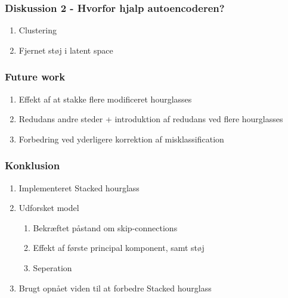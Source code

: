 \documentclass{beamer}
\begin{document}
\begin{frame}
    \frametitle{Diskussion 2 - Hvorfor hjalp autoencoderen?}
    \begin{enumerate}
        \item<1-> Clustering
        \item<2> Fjernet støj i latent space
    \end{enumerate}
\end{frame}

\begin{frame}
    \frametitle{Future work}
    \begin{enumerate}
        \item<1-> Effekt af at stakke flere modificeret hourglasses
        \item<2-> Redudans andre steder + introduktion af redudans ved flere hourglasses
        \item<3-> Forbedring ved yderligere korrektion af misklassification
    \end{enumerate}
\end{frame}

\begin{frame}
    \frametitle{Konklusion}
    \begin{enumerate}
        \item<1-> Implementeret Stacked hourglass
        \item<2-> Udforsket model
        \begin{enumerate}
            \item Bekræftet påstand om skip-connections
            \item Effekt af første principal komponent, samt støj
            \item Seperation
        \end{enumerate}
        \item<3-> Brugt opnået viden til at forbedre Stacked hourglass
    \end{enumerate}
\end{frame}
\end{document}
